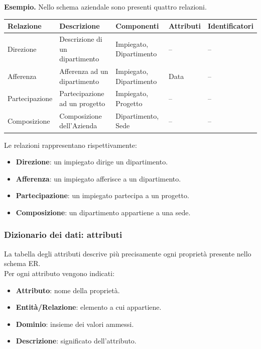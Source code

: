\noindent
\textcolor{verdeEsempio}{\textbf{Esempio. }}
Nello schema aziendale sono presenti quattro relazioni.

\begin{center}
\noindent
\small
\begin{tabular}{|l|l|l|l|l|}
\hline
\textbf{Relazione} & \textbf{Descrizione} & \textbf{Componenti} & \textbf{Attributi} & \textbf{Identificatori}\\
\hline
Direzione & Descrizione di un dipartimento & Impiegato, Dipartimento & -- & -- \\
\hline
Afferenza & Afferenza ad un dipartimento & Impiegato, Dipartimento & Data & -- \\
\hline
Partecipazione & Partecipazione ad un progetto & Impiegato, Progetto & -- & -- \\
\hline
Composizione & Composizione dell'Azienda & Dipartimento, Sede & -- & -- \\
\hline
\end{tabular}
\end{center}

\noindent
Le relazioni rappresentano rispettivamente:
\begin{itemize}
    \item \textbf{Direzione}: un impiegato dirige un dipartimento.
    \item \textbf{Afferenza}: un impiegato afferisce a un dipartimento.
    \item \textbf{Partecipazione}: un impiegato partecipa a un progetto.
    \item \textbf{Composizione}: un dipartimento appartiene a una sede.
\end{itemize}

\subsubsection*{Dizionario dei dati: attributi}

\noindent
La tabella degli attributi descrive più precisamente ogni proprietà
presente nello schema ER.\\
Per ogni attributo vengono indicati:
\begin{itemize}
    \item \textbf{Attributo}: nome della proprietà.
    \item \textbf{Entità/Relazione}: elemento a cui appartiene.
    \item \textbf{Dominio}: insieme dei valori ammessi.
    \item \textbf{Descrizione}: significato dell'attributo.
\end{itemize}

